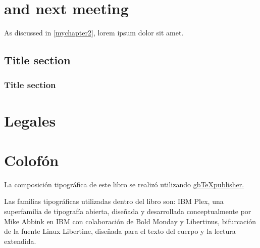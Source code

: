 \documentclass{book}
\begin{document}
\lipsum[1]

\chapter{and next meeting}
As discussed in \ref{mychapter2}, lorem ipsum dolor sit amet.

\lipsum[2]

\section{Title section}

\lipsum[3]

\subsection{Title section}

\lipsum[1]

\backmatter


\ForceHTMLPage
\printnoidxglossary[title={Glosario de términos}]

\ForceHTMLPage
\printbibliography[heading=bibintoc]

\chapter{Legales}

\lipsum[4]

\chapter{Colofón}

La composición tipográfica de este libro se realizó utilizando \href{https://github.com/albertomoyano/gbtexpublisher}{gbTeXpublisher.}

Las familias tipográficas utilizadas dentro del libro son: IBM Plex, una superfamilia de tipografía abierta, diseñada y desarrollada conceptualmente por Mike Abbink en IBM con colaboración de Bold Monday y Libertinus, bifurcación de la fuente Linux Libertine, diseñada para el texto del cuerpo y la lectura extendida.
\end{document}
